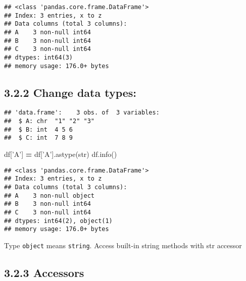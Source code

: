 \documentclass[]{book}
\newenvironment{Shaded}{\begin{snugshade}}{\end{snugshade}}
\newcommand{\BuiltInTok}[1]{#1}
\newcommand{\KeywordTok}[1]{\textcolor[rgb]{0.13,0.29,0.53}{\textbf{#1}}}
\newcommand{\NormalTok}[1]{#1}
\newcommand{\OperatorTok}[1]{\textcolor[rgb]{0.81,0.36,0.00}{\textbf{#1}}}
\newcommand{\StringTok}[1]{\textcolor[rgb]{0.31,0.60,0.02}{#1}}
\theoremstyle{definition}
\theoremstyle{definition}
\theoremstyle{definition}
\theoremstyle{remark}
\begin{document}
\begin{verbatim}
## <class 'pandas.core.frame.DataFrame'>
## Index: 3 entries, x to z
## Data columns (total 3 columns):
## A    3 non-null int64
## B    3 non-null int64
## C    3 non-null int64
## dtypes: int64(3)
## memory usage: 176.0+ bytes
\end{verbatim}

\hypertarget{change-data-types}{%
\subsection{3.2.2 Change data types:}\label{change-data-types}}

\begin{Shaded}
\end{Shaded}

\begin{verbatim}
## 'data.frame':    3 obs. of  3 variables:
##  $ A: chr  "1" "2" "3"
##  $ B: int  4 5 6
##  $ C: int  7 8 9
\end{verbatim}

\begin{Shaded}
\begin{Highlighting}[]
\NormalTok{df[}\StringTok{'A'}\NormalTok{] }\OperatorTok{=}\NormalTok{ df[}\StringTok{'A'}\NormalTok{].astype(}\BuiltInTok{str}\NormalTok{)}
\NormalTok{df.info()}
\end{Highlighting}
\end{Shaded}

\begin{verbatim}
## <class 'pandas.core.frame.DataFrame'>
## Index: 3 entries, x to z
## Data columns (total 3 columns):
## A    3 non-null object
## B    3 non-null int64
## C    3 non-null int64
## dtypes: int64(2), object(1)
## memory usage: 176.0+ bytes
\end{verbatim}

Type \texttt{object} means \texttt{string}. Access built-in string
methods with str accessor

\hypertarget{accessors}{%
\subsection{3.2.3 Accessors}\label{accessors}}
\end{document}
